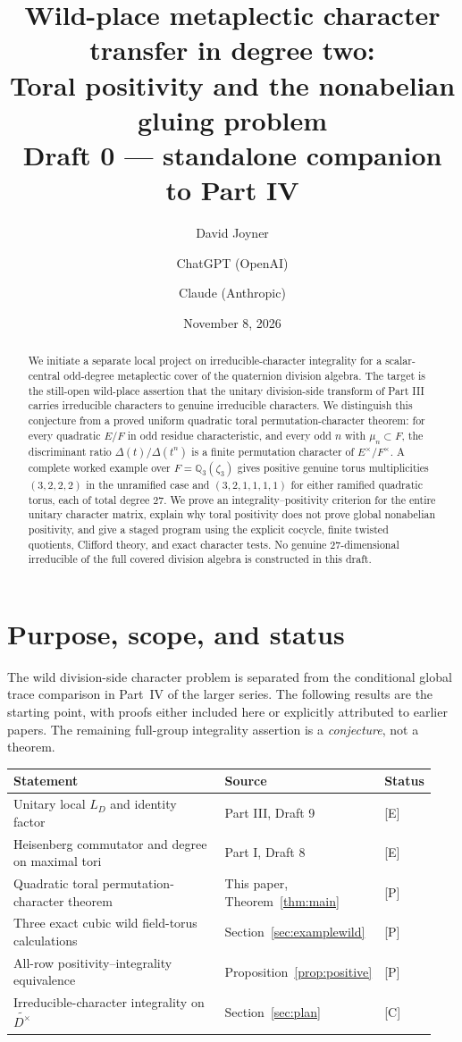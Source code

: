 \documentclass[11pt]{article}
\title{Wild-place metaplectic character transfer in degree two:\\
Toral positivity and the nonabelian gluing problem\\[0.4em]
\normalsize Draft 0 --- standalone companion to Part IV}
\author{David Joyner \and ChatGPT (OpenAI) \and Claude (Anthropic)}
\date{November 8, 2026}
\theoremstyle{plain}
\theoremstyle{definition}
\begin{document}
\maketitle
\begin{abstract}
We initiate a separate local project on irreducible-character
integrality for a scalar-central odd-degree metaplectic cover of
the quaternion division algebra.  The target is the still-open
wild-place assertion that the unitary division-side transform
of Part III carries irreducible characters to genuine
irreducible characters.  We distinguish this conjecture from a
proved uniform quadratic toral permutation-character theorem:
for every quadratic $E/F$ in odd residue characteristic, and
every odd $n$ with $\mu_n\subset F$, the discriminant ratio
$\Delta(t)/\Delta(t^n)$ is a finite permutation character of
$E^\times/F^\times$.  A complete worked example over
$F=\mathbb Q_3(\zeta_3)$ gives positive genuine torus
multiplicities $(3,2,2,2)$ in the unramified case and
$(3,2,1,1,1,1)$ for either ramified quadratic torus, each
of total degree $27$.  We prove an integrality--positivity
criterion for the entire unitary character matrix, explain why
toral positivity does not prove global nonabelian positivity,
and give a staged program using the explicit cocycle, finite
twisted quotients, Clifford theory, and exact character tests.
No genuine $27$-dimensional irreducible of the full covered
division algebra is constructed in this draft.
\end{abstract}
\tableofcontents
\section{Purpose, scope, and status}\label{sec:intro}
The wild division-side character problem is separated from the
conditional global trace comparison in Part~IV of the larger
series.  The following results are the starting point, with
proofs either included here or explicitly attributed to earlier
papers.  The remaining full-group integrality assertion is a
\emph{conjecture}, not a theorem.
\begin{center}\small
\begin{tabular}{@{}p{0.58\linewidth}p{0.28\linewidth}p{0.08\linewidth}@{}}
\toprule
Statement & Source & Status\\\midrule
Unitary local $L_D$ and identity factor & Part III, Draft 9 & [E]\\
Heisenberg commutator and degree on maximal tori & Part I, Draft 8 & [E]\\
Quadratic toral permutation-character theorem & This paper, Theorem~\ref{thm:main} & [P]\\
Three exact cubic wild field-torus calculations & Section~\ref{sec:examplewild} & [P]\\
All-row positivity--integrality equivalence & Proposition~\ref{prop:positive} & [P]\\
Irreducible-character integrality on $\widetilde{D^\times}$ & Section~\ref{sec:plan} & [C]\\
\bottomrule
\end{tabular}
\end{center}
\end{document}
